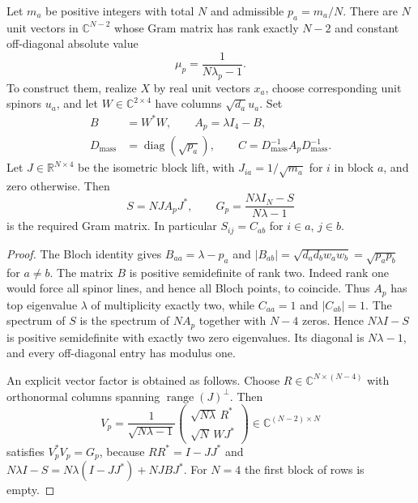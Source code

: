 \begin{proposition}\label{alg:construction}
Let $m_a$ be positive integers with total $N$ and admissible
$p_a=m_a/N$. There are $N$ unit vectors in $\mathbb C^{N-2}$ whose Gram
matrix has rank exactly $N-2$ and constant off-diagonal absolute value
\begin{equation}\label{alg:mu-profile}
 \mu_p=\frac1{N\lambda_p-1}.
\end{equation}
To construct them, realize $X$ by real unit vectors $x_a$, choose
corresponding unit spinors $u_a$, and let $W\in\mathbb C^{2\times4}$
have columns $\sqrt{d_a}u_a$. Set
\begin{equation}\label{alg:core}
\begin{aligned}
 B&=W^*W,\qquad A_p=\lambda I_4-B,\\
 D_{\mathrm{mass}}&=\operatorname{diag}(\sqrt{p_a}),\qquad
 C=D_{\mathrm{mass}}^{-1}A_pD_{\mathrm{mass}}^{-1}.
\end{aligned}
\end{equation}
Let $J\in\mathbb R^{N\times4}$ be the isometric block lift, with
$J_{ia}=1/\sqrt{m_a}$ for $i$ in block $a$, and zero otherwise. Then
\begin{equation}\label{alg:signature-Gram}
 S=NJA_pJ^*,\qquad G_p=\frac{N\lambda I_N-S}{N\lambda-1}
\end{equation}
is the required Gram matrix. In particular $S_{ij}=C_{ab}$ for
$i\in a$, $j\in b$.
\end{proposition}
\begin{proof}
The Bloch identity gives $B_{aa}=\lambda-p_a$ and
$|B_{ab}|=\sqrt{d_ad_bw_aw_b}=\sqrt{p_ap_b}$ for $a\ne b$.
The matrix $B$ is positive semidefinite of rank two. Indeed rank one
would force all spinor lines, and hence all Bloch points, to coincide.
Thus $A_p$ has top eigenvalue $\lambda$ of multiplicity exactly two,
while $C_{aa}=1$ and $|C_{ab}|=1$. The spectrum of $S$ is the spectrum
of $NA_p$ together with $N-4$ zeros. Hence $N\lambda I-S$ is positive
semidefinite with exactly two zero eigenvalues. Its diagonal is
$N\lambda-1$, and every off-diagonal entry has modulus one.

An explicit vector factor is obtained as follows.
Choose $R\in\mathbb C^{N\times(N-4)}$ with orthonormal columns
spanning $\operatorname{range}(J)^\perp$. Then
\begin{equation}\label{alg:vector-factor}
 V_p=\frac1{\sqrt{N\lambda-1}}
       \begin{pmatrix}\sqrt{N\lambda}\,R^*\\ \sqrt N\,WJ^*\end{pmatrix}
       \in\mathbb C^{(N-2)\times N}
\end{equation}
satisfies $V_p^*V_p=G_p$, because
$RR^*=I-JJ^*$ and
$N\lambda I-S=N\lambda(I-JJ^*)+NJBJ^*$.
For $N=4$ the first block of rows is empty.
\end{proof}

